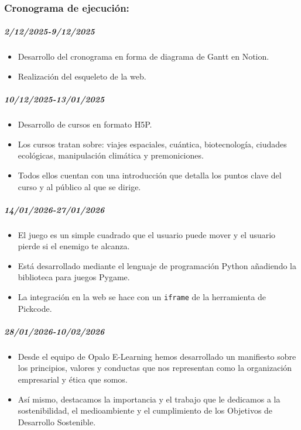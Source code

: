 \documentclass[11.5pt]{article}
\begin{document}
	\subsubsection{Cronograma de ejecución:}
	
	\subparagraph*{2/12/2025-9/12/2025}
	
	\begin{itemize}
		\item Desarrollo del cronograma en forma de diagrama de Gantt en Notion.
		\item 	Realización del esqueleto de la web.
	\end{itemize}
	
	\subparagraph*{10/12/2025-13/01/2025}
	
	\begin{itemize}
		\item Desarrollo de cursos en formato H5P.
		\item 	Los cursos tratan sobre: viajes espaciales, cuántica, biotecnología, ciudades ecológicas, manipulación climática y premoniciones.
		\item 	Todos ellos cuentan con una introducción que detalla los puntos clave del curso y al público al que se dirige.
	\end{itemize}
	
	\subparagraph*{14/01/2026-27/01/2026}
	
	\begin{itemize}
		\item El juego es un simple cuadrado que el usuario puede mover y el usuario pierde si el enemigo te alcanza.
		\item 	Está desarrollado mediante el lenguaje de programación Python añadiendo la biblioteca para juegos Pygame.
		\item 	La integración en la web se hace con un \verb|iframe| de la herramienta de Pickcode.
	\end{itemize}
	
	\subparagraph*{28/01/2026-10/02/2026}
	
	\begin{itemize}
		\item Desde el equipo de Opalo E-Learning hemos desarrollado un manifiesto sobre los principios, valores y conductas que nos representan como la organización empresarial y ética que somos.
		\item 	Así mismo, destacamos la importancia y el trabajo que le dedicamos a la sostenibilidad, el medioambiente y el cumplimiento de los Objetivos de Desarrollo Sostenible.
	\end{itemize}
	
\end{document}
